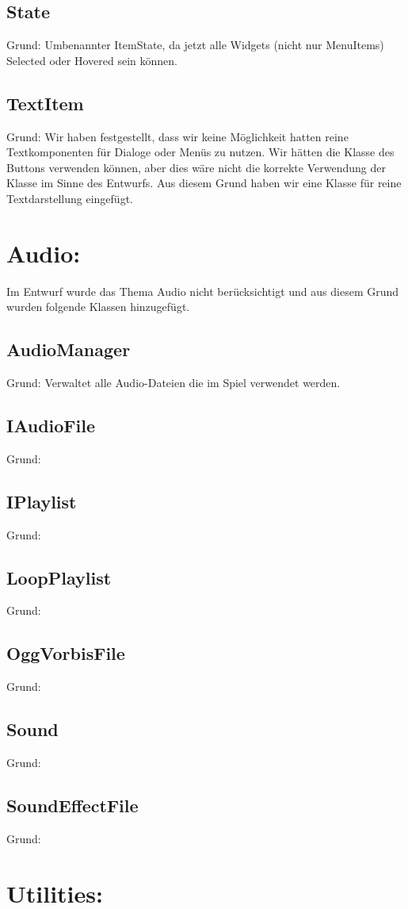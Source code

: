 \subsection{State}
Grund: Umbenannter ItemState, da jetzt alle Widgets (nicht nur MenuItems) Selected oder Hovered sein können.
\subsection{TextItem}
Grund: Wir haben festgestellt, dass wir keine Möglichkeit hatten reine Textkomponenten für Dialoge oder Menüs zu nutzen. Wir hätten die Klasse des Buttons verwenden können, aber dies wäre nicht die korrekte Verwendung der Klasse im Sinne des Entwurfs. Aus diesem Grund haben wir eine Klasse für reine Textdarstellung eingefügt.

\section{Audio:}
Im Entwurf wurde das Thema Audio nicht berücksichtigt und aus diesem Grund wurden folgende Klassen hinzugefügt.
\subsection{AudioManager}
Grund: Verwaltet alle Audio-Dateien die im Spiel verwendet werden. 
\subsection{IAudioFile}
Grund:
\subsection{IPlaylist}
Grund:
\subsection{LoopPlaylist}
Grund:
\subsection{OggVorbisFile}
Grund:
\subsection{Sound}
Grund:
\subsection{SoundEffectFile}
Grund:

\section{Utilities:}
